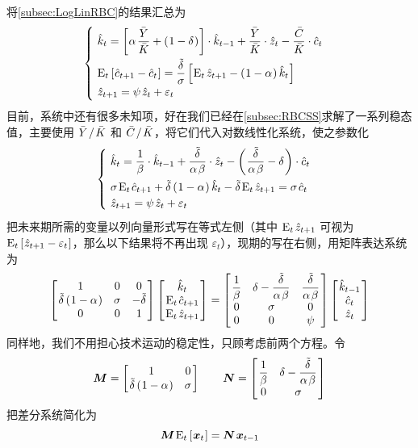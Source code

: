 将\ref{subsec:LogLinRBC}的结果汇总为
\begin{equation}
    \begin{cases}
        \ \hat k_t=\bks{\alpha\,\dfrac{\bar Y}{\bar K}+\bka{1-\delta}}\cdot\hat k\lt+\dfracb{Y}{K}\cdot\hat z_t-\dfracb{C}{K}\cdot\hat c_t \\[2ex]
        \ \mean_t\bks{\hat c\nt-\hat c_t}=\dfrac{\tilde\delta}{\sigma}\bks{\mean_t\,\hat z\nt-\bka{1-\alpha}\hat k_t} \\
        \ \hat z\nt=\psi\,\hat z_t+\varepsilon_{t}
    \end{cases}
\end{equation}
目前，系统中还有很多未知项，好在我们已经在\ref{subsec:RBCSS}求解了一系列稳态值，主要使用 \(\bar Y{\mspace{2mu}}/{\mspace{2mu}}\bar K\) 和 \(\bar C{\mspace{2mu}}/{\mspace{2mu}}\bar K\)，将它们代入对数线性化系统，使之参数化
\begin{equation}
    \begin{cases}
        \ \hat k_t=\dfrac1\beta\cdot\hat k\lt+\dfrac{\tilde\delta}{\alpha\,\beta}\cdot\hat z_t-\bka{\dfrac{\tilde\delta}{\alpha\,\beta}-\delta}\cdot\hat c_t \\[2ex]
        \ \sigma\,\mean_t\,\hat c\nt+\tilde\delta\bka{1-\alpha}\hat k_t-\tilde\delta\,\mean_t\,\hat z\nt=\sigma\,\hat c_t \\
        \ \hat z\nt=\psi\,\hat z_t+\varepsilon_{t}
    \end{cases}
\end{equation}
把未来期所需的变量以列向量形式写在等式左侧（其中 \(\mean_t\,\hat z\nt\) 可视为 \(\text{E}_t\left[\mspace{1mu}\hat z_{t+1}-\varepsilon_t\mspace{1mu}\right]\)，那么以下结果将不再出现 \(\varepsilon_t\)），现期的写在右侧，用矩阵表达系统为
\begin{equation*}
    \matbks{1&0&0\\\tilde\delta\bka{1-\alpha}&\sigma&-\tilde\delta\\0&0&1}
    \matbks{\hat k_t\\\mean_t\,\hat c\nt\\\mean_t\,\hat z\nt}
    =
    \matbks{\dfrac1\beta&\delta-\dfrac{\tilde\delta}{\alpha\,\beta}&\dfrac{\tilde\delta}{\alpha\,\beta}\\0&\sigma&0\\0&0&\psi}
    \matbks{\hat k\lt\\\hat c_t\\\hat z_t}
\end{equation*}
同样地，我们不用担心技术运动的稳定性，只顾考虑前两个方程。令
\begin{equation*}
    \bs M=\matbks{1&0\\\tilde\delta\bka{1-\alpha}&\sigma}\qquad \bs N =\matbks{\dfrac1\beta&\delta-\dfrac{\tilde\delta}{\alpha\,\beta}\\0&\sigma}
\end{equation*}
把差分系统简化为
\begin{equation*}
    \bs{M}\,\mean_t\bks{\bs x_t}=\bs{N}\,\bs x\lt
\end{equation*}


